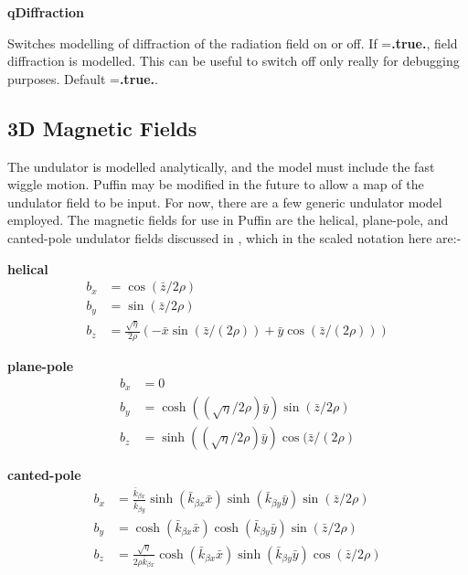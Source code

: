 \documentclass[12pt]{article}%
\begin{document}
{\bf qDiffraction}

Switches modelling of diffraction of the radiation field on or off. If ={\bf .true.}, field diffraction is modelled. This can be useful to switch off only really for debugging purposes. Default ={\bf .true.}.



\subsection{3D Magnetic Fields}

The undulator is modelled analytically, and the model must include the fast wiggle motion. Puffin may be modified in the future to allow a map of the undulator field to be input. For now, there are a few generic undulator model employed. The magnetic fields for use in Puffin are the helical, plane-pole, and canted-pole undulator fields discussed in \cite{scharlemann1}, which in the scaled notation here are:-

{\bf helical}
\begin{align}
b_x  & = \cos({\bar{z}/2\rho}) \\
b_y & =  \sin({\bar{z}/2\rho}) \\
b_z & = \frac{\sqrt{\eta}}{2\rho} (-\bar{x}\sin({\bar{z} / (2 \rho)}) + \bar{y}\cos({\bar{z} / (2 \rho)}))
\end{align}


{\bf plane-pole}
\begin{align}
b_x  & = 0 \\
b_y & =  \cosh((\sqrt{\eta}/{2\rho}) \bar{y}) \sin({\bar{z}/2\rho}) \\
b_z & =   \sinh((\sqrt{\eta}/{2\rho}) \bar{y}) \cos({\bar{z} / (2 \rho)}
\end{align}




{\bf canted-pole}
\begin{align}
b_x  & =  \frac{\bar{k}_{\beta x}}{\bar{k}_{\beta y}}  \sinh(\bar{k}_{\beta x} \bar{x} )  \sinh(   \bar{k}_{\beta y} \bar{y}    )   \sin({\bar{z}/2\rho}) \label{cp1} \\
b_y & =   \cosh(\bar{k}_{\beta x} \bar{x} )  \cosh(   \bar{k}_{\beta y} \bar{y}    )   \sin({\bar{z}/2\rho}) \label{cp2}\\
b_z & = \frac{\sqrt{\eta}}{2\rho \bar{k}_{\beta x}}     \cosh(\bar{k}_{\beta x} \bar{x} )    \sinh(   \bar{k}_{\beta y} \bar{y}    )    \cos({\bar{z}/2\rho}) \label{cp3}
\end{align}
\end{document}
